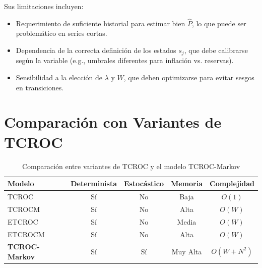 Sus limitaciones incluyen:
\begin{itemize}
    \item Requerimiento de suficiente historial para estimar bien \(\hat{P}\), lo que puede ser problemático en series cortas.
    \item Dependencia de la correcta definición de los estados \( s_j \), que debe calibrarse según la variable (e.g., umbrales diferentes para inflación vs. reservas).
    \item Sensibilidad a la elección de \(\lambda\) y \( W \), que deben optimizarse para evitar sesgos en transiciones.
\end{itemize}

\section{Comparación con Variantes de TCROC}
\label{sec:tcroc_markov_comparacion}

\begin{table}[htbp]
\centering
\caption{Comparación entre variantes de TCROC y el modelo TCROC-Markov}
\label{tab:comparacion_tcroc_markov}
\begin{tabular}{|l|c|c|c|c|}
\hline
\textbf{Modelo} & \textbf{Determinista} & \textbf{Estocástico} & \textbf{Memoria} & \textbf{Complejidad} \\
\hline
TCROC & Sí & No & Baja & \(O(1)\) \\
TCROCM & Sí & No & Alta & \(O(W)\) \\
ETCROC & Sí & No & Media & \(O(W)\) \\
ETCROCM & Sí & No & Alta & \(O(W)\) \\
\textbf{TCROC-Markov} & Sí & Sí & Muy Alta & \(O(W + N^2)\) \\
\hline
\end{tabular}
\end{table}



